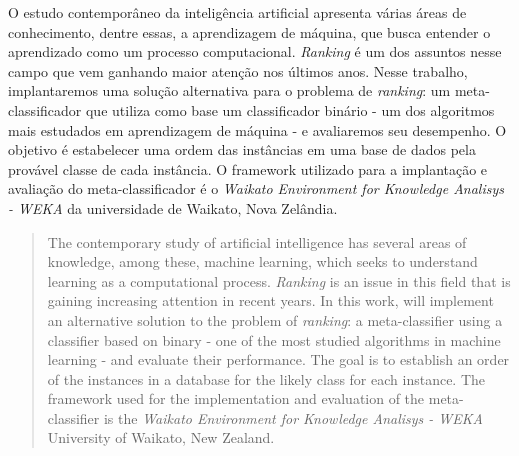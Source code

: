 \documentclass[12pt, a4paper]{abnt}
\begin{document}
\begin{resumo}
O estudo contemporâneo da inteligência artificial apresenta várias áreas de conhecimento, dentre essas, a aprendizagem de máquina, que busca entender o aprendizado como um processo computacional.
\emph{Ranking} é um dos assuntos nesse campo que vem ganhando maior atenção nos últimos anos.
Nesse trabalho, implantaremos uma solução alternativa para o problema de \emph{ranking}: um meta-classificador que utiliza como base um classificador binário - um dos algoritmos mais estudados em aprendizagem de máquina - e avaliaremos seu desempenho.
O objetivo é estabelecer uma ordem das instâncias em uma base de dados pela provável classe de cada instância.
O framework utilizado para a implantação e avaliação do meta-classificador é o \emph{Waikato Environment for Knowledge Analisys - WEKA} da universidade de Waikato, Nova Zelândia.
\end{resumo}

\begin{abstract}
The contemporary study of artificial intelligence has several areas of knowledge, among these, machine learning, which seeks to understand learning as a computational process.
\emph{Ranking} is an issue in this field that is gaining increasing attention in recent years.
In this work, will implement an alternative solution to the problem of \emph{ranking}: a meta-classifier using a classifier based on binary - one of the most studied algorithms in machine learning - and evaluate their performance.
The goal is to establish an order of the instances in a database for the likely class for each instance. The framework used for the implementation and evaluation of the meta-classifier is the \emph{Waikato Environment for Knowledge Analisys - WEKA} University of Waikato, New Zealand.
\end{abstract}


\end{document}

